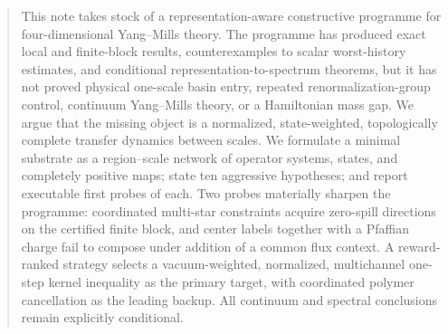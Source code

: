 \begin{abstract}
This note takes stock of a representation-aware constructive programme for
four-dimensional Yang--Mills theory.  The programme has produced exact local
and finite-block results, counterexamples to scalar worst-history estimates,
and conditional representation-to-spectrum theorems, but it has not proved
physical one-scale basin entry, repeated renormalization-group control,
continuum Yang--Mills theory, or a Hamiltonian mass gap.  We argue that the
missing object is a normalized, state-weighted, topologically complete
transfer dynamics between scales.  We formulate a minimal substrate as a
region--scale network of operator systems, states, and completely positive
maps; state ten aggressive hypotheses; and report executable first probes of
each.  Two probes materially sharpen the programme: coordinated multi-star
constraints acquire zero-spill directions on the certified finite block, and
center labels together with a Pfaffian charge fail to compose under addition
of a common flux context.  A reward-ranked strategy selects a
vacuum-weighted, normalized, multichannel one-step kernel inequality as the
primary target, with coordinated polymer cancellation as the leading backup.
All continuum and spectral conclusions remain explicitly conditional.
\end{abstract}
